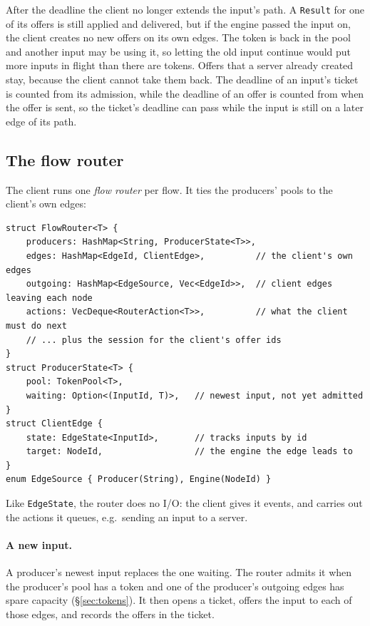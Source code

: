 \documentclass[11pt]{article}
\newcommand{\code}[1]{\texttt{#1}}
\begin{document}
After the deadline the client no longer extends the input's path. A
\code{Result} for one of its offers is still applied and delivered, but if the
engine passed the input on, the client creates no new offers on its own edges.
The token is back in the pool and another input may be using it, so letting
the old input continue would put more inputs in flight than there are tokens.
Offers that a server already created stay, because the client cannot take them
back. The deadline of an input's ticket is counted from its admission, while
the deadline of an offer is counted from when the offer is sent, so the
ticket's deadline can pass while the input is still on a later edge of its
path.

\subsection{The flow router}
\label{sec:router}

The client runs one \emph{flow router} per flow. It ties the producers' pools
to the client's own edges:
\begin{lstlisting}
struct FlowRouter<T> {
    producers: HashMap<String, ProducerState<T>>,
    edges: HashMap<EdgeId, ClientEdge>,          // the client's own edges
    outgoing: HashMap<EdgeSource, Vec<EdgeId>>,  // client edges leaving each node
    actions: VecDeque<RouterAction<T>>,          // what the client must do next
    // ... plus the session for the client's offer ids
}
struct ProducerState<T> {
    pool: TokenPool<T>,
    waiting: Option<(InputId, T)>,   // newest input, not yet admitted
}
struct ClientEdge {
    state: EdgeState<InputId>,       // tracks inputs by id
    target: NodeId,                  // the engine the edge leads to
}
enum EdgeSource { Producer(String), Engine(NodeId) }
\end{lstlisting}
Like \code{EdgeState}, the router does no I/O: the client gives it events, and
carries out the actions it queues, e.g.\ sending an input to a server.

\paragraph{A new input.} A producer's newest input replaces the one waiting.
The router admits it when the producer's pool has a token and one of the
producer's outgoing edges has spare capacity (\S\ref{sec:tokens}). It then
opens a ticket, offers the input to each of those edges, and records the
offers in the ticket.
\end{document}
